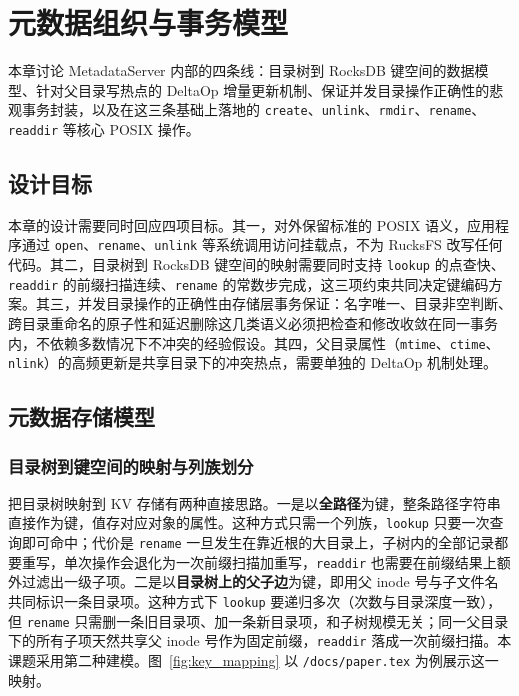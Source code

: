 \section{元数据组织与事务模型}
\label{sec:design}

本章讨论 MetadataServer 内部的四条线：目录树到 RocksDB 键空间的数据模型、针对父目录写热点的 DeltaOp 增量更新机制、保证并发目录操作正确性的悲观事务封装，以及在这三条基础上落地的 \texttt{create}、\texttt{unlink}、\texttt{rmdir}、\texttt{rename}、\texttt{readdir} 等核心 POSIX 操作。

\subsection{设计目标}
\label{sec:goals}

本章的设计需要同时回应四项目标。其一，对外保留标准的 POSIX 语义，应用程序通过 \texttt{open}、\texttt{rename}、\texttt{unlink} 等系统调用访问挂载点，不为 RucksFS 改写任何代码。其二，目录树到 RocksDB 键空间的映射需要同时支持 \texttt{lookup} 的点查快、\texttt{readdir} 的前缀扫描连续、\texttt{rename} 的常数步完成，这三项约束共同决定键编码方案。其三，并发目录操作的正确性由存储层事务保证：名字唯一、目录非空判断、跨目录重命名的原子性和延迟删除这几类语义必须把检查和修改收敛在同一事务内，不依赖多数情况下不冲突的经验假设。其四，父目录属性（\texttt{mtime}、\texttt{ctime}、\texttt{nlink}）的高频更新是共享目录下的冲突热点，需要单独的 DeltaOp 机制处理。

\subsection{元数据存储模型}
\label{sec:datamodel}

\subsubsection{目录树到键空间的映射与列族划分}

把目录树映射到 KV 存储有两种直接思路。一是以\textbf{全路径}为键，整条路径字符串直接作为键，值存对应对象的属性。这种方式只需一个列族，\texttt{lookup} 只要一次查询即可命中；代价是 \texttt{rename} 一旦发生在靠近根的大目录上，子树内的全部记录都要重写，单次操作会退化为一次前缀扫描加重写，\texttt{readdir} 也需要在前缀结果上额外过滤出一级子项。二是以\textbf{目录树上的父子边}为键，即用父 inode 号与子文件名共同标识一条目录项。这种方式下 \texttt{lookup} 要递归多次（次数与目录深度一致），但 \texttt{rename} 只需删一条旧目录项、加一条新目录项，和子树规模无关；同一父目录下的所有子项天然共享父 inode 号作为固定前缀，\texttt{readdir} 落成一次前缀扫描。本课题采用第二种建模。图~\ref{fig:key_mapping} 以 \texttt{/docs/paper.tex} 为例展示这一映射。

